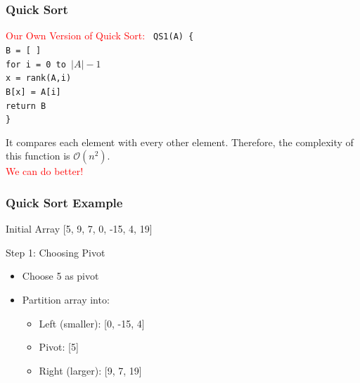 \begin{frame}
    \frametitle{Quick Sort}
    \begin{block}{\textcolor{red}{Our Own Version of Quick Sort:}}
     \texttt{
        QS1(A) \{ \\
        \quad B = [ ] \\
        \quad for i = 0 to $|A| - 1$ \\
        \quad x = rank(A,i) \\
        \quad B[x] = A[i]\\ 
        \quad return B\\
        \}
        }
    \end{block}
It compares each element with every other element. Therefore, the complexity of this function is \(\mathcal{O}(n^2)\). \\
\vspace{0.3cm}
\textcolor{red}{We can do better!}
\end{frame}


\begin{frame}
    \frametitle{Quick Sort Example}
    \begin{block}{Initial Array}
        [5, 9, 7, 0, -15, 4, 19]
    \end{block}
    
    \begin{block}{Step 1: Choosing Pivot}
        \begin{itemize}
            \item Choose 5 as pivot
            \item Partition array into:
            \begin{itemize}
                \item Left (smaller): [0, -15, 4]
                \item Pivot: [5]
                \item Right (larger): [9, 7, 19]
            \end{itemize}
        \end{itemize}
    \end{block}
\end{frame}

